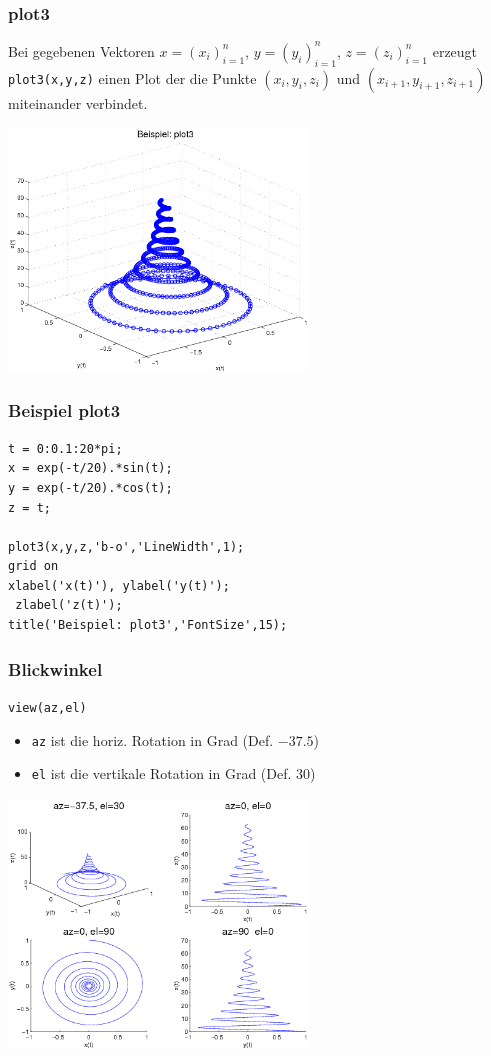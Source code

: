 % 
% 
\begin{frame}[fragile]\frametitle{plot3}
Bei gegebenen Vektoren $x=(x_i)_{i=1}^n$, $y=(y_i)_{i=1}^n$,
$z=(z_i)_{i=1}^n$ erzeugt \alert{ \lstinline!plot3(x,y,z)!} einen Plot der die Punkte
$(x_i,y_i,z_i)$ und $(x_{i+1},y_{i+1},z_{i+1})$ miteinander
verbindet. \\
\begin{center}\includegraphics[width=0.6\textwidth]{./figures/beispiel_plot3}\end{center}
\end{frame}
% 
% 
\begin{frame}[fragile]\frametitle{Beispiel plot3}
\begin{lstlisting}
t = 0:0.1:20*pi;
x = exp(-t/20).*sin(t);
y = exp(-t/20).*cos(t);
z = t;

plot3(x,y,z,'b-o','LineWidth',1);
grid on
xlabel('x(t)'), ylabel('y(t)');
 zlabel('z(t)');
title('Beispiel: plot3','FontSize',15);
\end{lstlisting}
\end{frame}
% 
% 
\begin{frame}[fragile]\frametitle{Blickwinkel}
\centering\alert{ \lstinline!view(az,el)!}
\begin{itemize}
\item \alert{ \lstinline!az!} ist die horiz. Rotation in Grad (Def. \alert{
  $-37.5$}) 
\item \alert{ \lstinline!el!} ist die vertikale Rotation in Grad (Def. \alert{
  $30$})
\end{itemize}
\begin{center}\includegraphics[width=0.6\textwidth]{./figures/beispiel_plot3_2}\end{center}
\end{frame}
